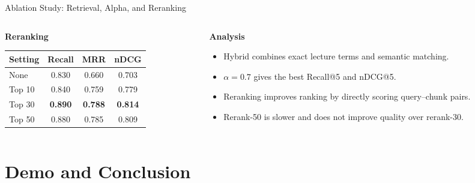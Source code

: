 \documentclass[10pt,aspectratio=169]{beamer}
\begin{document}
\begin{frame}{Ablation Study: Retrieval, Alpha, and Reranking}
\begin{columns}[T,totalwidth=\textwidth]
\begin{column}{0.60\textwidth}
            \vspace{0.6em}
            \textbf{Reranking}
            \begin{tabular}{lccc}
                \toprule
                Setting & Recall & MRR & nDCG \\
                \midrule
                None & 0.830 & 0.660 & 0.703 \\
                Top 10 & 0.840 & 0.759 & 0.779 \\
                Top 30 & \textbf{0.890} & \textbf{0.788} & \textbf{0.814} \\
                Top 50 & 0.880 & 0.785 & 0.809 \\
                \bottomrule
            \end{tabular}
        \end{column}
        \begin{column}{0.36\textwidth}
            \textbf{Analysis}
            \begin{itemize}
                \item Hybrid combines exact lecture terms and semantic matching.
                \item $\alpha=0.7$ gives the best Recall@5 and nDCG@5.
                \item Reranking improves ranking by directly scoring query--chunk pairs.
                \item Rerank-50 is slower and does not improve quality over rerank-30.
            \end{itemize}
        \end{column}
    \end{columns}
\end{frame}

\section{Demo and Conclusion}
\end{document}
